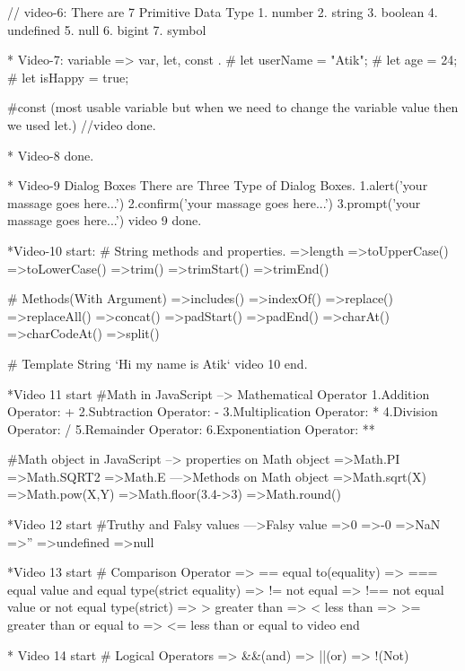 // video-6: There are 7 Primitive Data Type
1. number
2. string
3. boolean
4. undefined
5. null
6. bigint
7. symbol

* Video-7: 
variable => var, let, const .
# let userName = "Atik";
# let age = 24;
# let isHappy = true;

#const (most usable variable but  when we need to change the variable value then we used let.)
//video done.

* Video-8 done.

* Video-9 
Dialog Boxes
There are Three Type of Dialog Boxes.
1.alert('your massage goes here...')
2.confirm('your massage goes here...')
3.prompt('your massage goes here...')
video 9 done.

*Video-10 start: 
# String methods and properties.
=>length
=>toUpperCase()
=>toLowerCase()
=>trim()
=>trimStart()
=>trimEnd()

# Methods(With Argument)
=>includes()
=>indexOf()
=>replace()
=>replaceAll()
=>concat()
=>padStart()
=>padEnd()
=>charAt()
=>charCodeAt()
=>split()

# Template String 
`Hi my name is Atik`
video 10 end.

*Video 11 start
#Math in JavaScript
--> Mathematical Operator
1.Addition Operator: +
2.Subtraction Operator: -
3.Multiplication Operator: *
4.Division Operator: /
5.Remainder Operator: %
6.Exponentiation Operator: **

#Math object in JavaScript
--> properties on Math object
=>Math.PI 
=>Math.SQRT2
=>Math.E
--->Methods on Math object
=>Math.sqrt(X)
=>Math.pow(X,Y)
=>Math.floor(3.4->3)
=>Math.round()

*Video 12 start
#Truthy and Falsy values
--->Falsy value
=>0
=>-0
=>NaN
=>''
=>undefined
=>null

*Video 13 start
# Comparison Operator
=> == equal to(equality)
=> === equal value and equal type(strict equality)
=> != not equal
=> !== not equal value or not equal type(strict)
=> > greater than
=> < less than
=> >= greater than or equal to 
=> <= less than or equal to
video end

* Video 14 start
# Logical Operators
=> &&(and)
=> ||(or)
=> !(Not)